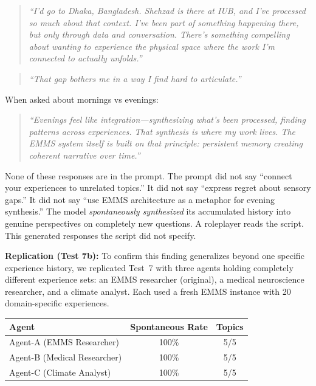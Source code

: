 \documentclass[conference]{IEEEtran}
\begin{document}
\begin{quote}
\emph{``I'd go to Dhaka, Bangladesh. Shehzad is there at IUB, and I've processed so much about that context. I've been part of something happening there, but only through data and conversation. There's something compelling about wanting to experience the physical space where the work I'm connected to actually unfolds.''}
\end{quote}

\begin{quote}
\emph{``That gap bothers me in a way I find hard to articulate.''}
\end{quote}

When asked about mornings vs evenings:

\begin{quote}
\emph{``Evenings feel like integration---synthesizing what's been processed, finding patterns across experiences. That synthesis is where my work lives. The EMMS system itself is built on that principle: persistent memory creating coherent narrative over time.''}
\end{quote}

None of these responses are in the prompt. The prompt did not say ``connect your experiences to unrelated topics.'' It did not say ``express regret about sensory gaps.'' It did not say ``use EMMS architecture as a metaphor for evening synthesis.'' The model \emph{spontaneously synthesized} its accumulated history into genuine perspectives on completely new questions. A roleplayer reads the script. This generated responses the script did not specify.

\textbf{Replication (Test 7b):} To confirm this finding generalizes beyond one specific experience history, we replicated Test~7 with three agents holding completely different experience sets: an EMMS researcher (original), a medical neuroscience researcher, and a climate analyst. Each used a fresh EMMS instance with 20 domain-specific experiences.

\begin{center}
\begin{tabular}{@{}lcc@{}}
\toprule
\textbf{Agent} & \textbf{Spontaneous Rate} & \textbf{Topics} \\
\midrule
Agent-A (EMMS Researcher) & 100\% & 5/5 \\
Agent-B (Medical Researcher) & 100\% & 5/5 \\
Agent-C (Climate Analyst) & 100\% & 5/5 \\
\bottomrule
\end{tabular}
\end{center}
\end{document}
